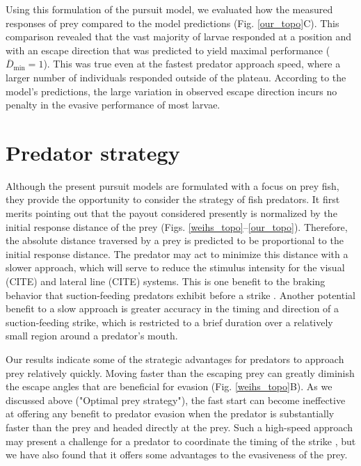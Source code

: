 \documentclass[12pt]{article}
\newcommand{\ol}{\overline}
\begin{document}
Using this formulation of the pursuit model, we evaluated how the measured responses of prey compared to the model predictions (Fig. \ref{our_topo}C). This comparison revealed that the vast majority of larvae responded at a position and with an escape direction that was predicted to yield maximal performance  ($\ol D_{\text{min}}=1$). This was true even at the fastest predator approach speed, where a larger number of individuals responded outside of the plateau.  According to the model's predictions, the large variation in observed escape direction incurs no penalty in the evasive performance of most larvae. 

\section{Predator strategy}

Although the present pursuit models are formulated with a focus on prey fish, they provide the opportunity to consider the strategy of fish predators. It first merits pointing out that the payout considered presently is normalized by the initial response distance of the prey (Figs. \ref{weihs_topo}--\ref{our_topo}). Therefore, the absolute distance traversed by a prey is predicted to be proportional to the initial response distance. The predator may act to minimize this distance with a slower approach, which will serve to reduce the stimulus intensity for the visual (CITE) and lateral line (CITE) systems. This is one benefit to the braking behavior that suction-feeding predators exhibit before a strike \citep{Higham:2007go, Higham:2005iu}. Another potential benefit to a slow approach is greater accuracy in the timing and direction of a suction-feeding strike, which is restricted to a brief duration over a relatively small region around a predator's mouth. 

Our results indicate some of the strategic advantages for predators to approach prey relatively quickly. Moving faster than the escaping prey can greatly diminish the escape angles that are beneficial for evasion (Fig. \ref{weihs_topo}B). As we discussed above ("Optimal prey strategy"), the fast start can become ineffective at offering any benefit to predator evasion when the predator is substantially faster than the prey and headed directly at the prey. Such a high-speed approach may present a challenge for a predator to coordinate the timing of the strike \citep{Higham:2007go, Higham:2005iu}, but we have also found that it offers some advantages to the evasiveness of the prey. 
\end{document}
